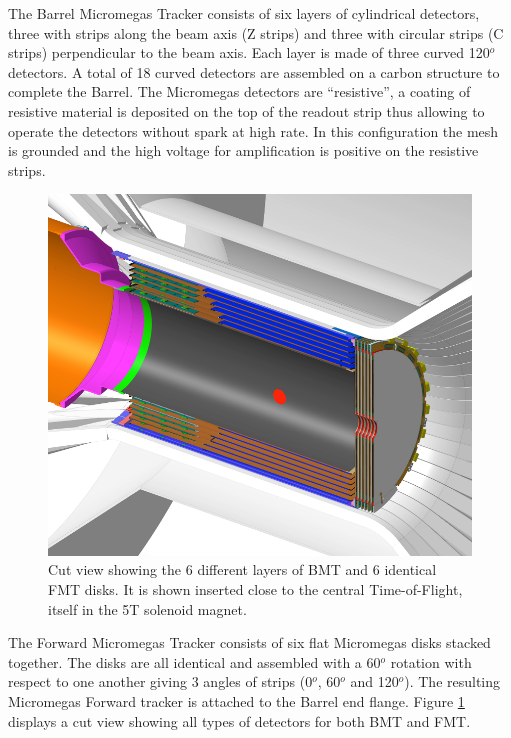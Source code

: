 The Barrel Micromegas Tracker consists of six layers of cylindrical detectors, three with strips along the beam axis (Z strips) and three with circular strips (C strips) perpendicular to the beam axis. Each layer is made of three curved 120$^o$ detectors. A total of 18 curved detectors are assembled on a carbon structure to complete the Barrel. The Micromegas detectors are ``resistive'', a coating of resistive material is deposited on the top of the readout strip thus allowing to operate the detectors without spark at high rate. In this configuration the mesh is grounded and the high voltage for amplification is positive on the resistive strips.

\begin{figure}[htb]
 \includegraphics[width=1.0\columnwidth,keepaspectratio]{images/fig1}
 \caption{Cut view showing the 6 different layers of BMT and 6 identical FMT disks. It is shown inserted close to the central Time-of-Flight, itself in the 5T solenoid magnet.}
 \label{fig:mm-fig1}
\end{figure}

The Forward Micromegas Tracker consists of six flat Micromegas disks stacked together. The disks are all identical and assembled with a 60$^o$ rotation with respect to one another giving 3 angles of strips (0$^o$, 60$^o$ and 120$^o$). The resulting Micromegas Forward tracker is attached to the Barrel end flange. Figure \ref{fig:mm-fig1} displays a cut view showing all types of detectors for both BMT and FMT.

